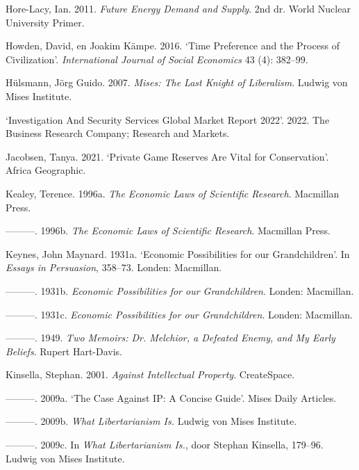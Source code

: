 \documentclass[
  a5paper,
  smalldemyvopaper,11pt,twoside,onecolumn,openright,extrafontsizes,
hidelinks]{memoir}
\newlength{\cslhangindent}
\newenvironment{CSLReferences}[2] %
 {\begin{list}{}{%
  \setlength{\itemindent}{0pt}
  \setlength{\leftmargin}{0pt}
  \setlength{\parsep}{0pt}
  \ifodd #1
   \setlength{\leftmargin}{\cslhangindent}
   \setlength{\itemindent}{-1\cslhangindent}
  \fi
  \setlength{\itemsep}{#2\baselineskip}}}
 {\end{list}}
\begin{document}
\begin{CSLReferences}{1}{0}
Hore-Lacy, Ian. 2011. \emph{Future Energy Demand and Supply}. 2nd dr.
World Nuclear University Primer.

Howden, David, en Joakim Kämpe. 2016. {`Time Preference and the Process
of Civilization'}. \emph{International Journal of Social Economics} 43
(4): 382--99.

Hülsmann, Jörg Guido. 2007. \emph{Mises: The Last Knight of Liberalism}.
Ludwig von Mises Institute.

{`Investigation And Security Services Global Market Report 2022'}. 2022.
The Business Research Company; Research and Markets.

Jacobsen, Tanya. 2021. {`Private Game Reserves Are Vital for
Conservation'}. Africa Geographic.

Kealey, Terence. 1996a. \emph{The Economic Laws of Scientific Research}.
Macmillan Press.

---------. 1996b. \emph{The Economic Laws of Scientific Research}.
Macmillan Press.

Keynes, John Maynard. 1931a. {`Economic Possibilities for our
Grandchildren'}. In \emph{Essays in Persuasion}, 358--73. Londen:
Macmillan.

---------. 1931b. \emph{Economic Possibilities for our Grandchildren}.
Londen: Macmillan.

---------. 1931c. \emph{Economic Possibilities for our Grandchildren}.
Londen: Macmillan.

---------. 1949. \emph{Two Memoirs: Dr. Melchior, a Defeated Enemy, and
My Early Beliefs}. Rupert Hart-Davis.

Kinsella, Stephan. 2001. \emph{Against Intellectual Property}.
CreateSpace.

---------. 2009a. {`The Case Against IP: A Concise Guide'}. Mises Daily
Articles.

---------. 2009b. \emph{What Libertarianism Is.} Ludwig von Mises
Institute.

---------. 2009c. In \emph{What Libertarianism Is.}, door Stephan
Kinsella, 179--96. Ludwig von Mises Institute.


\end{CSLReferences}
\end{document}
